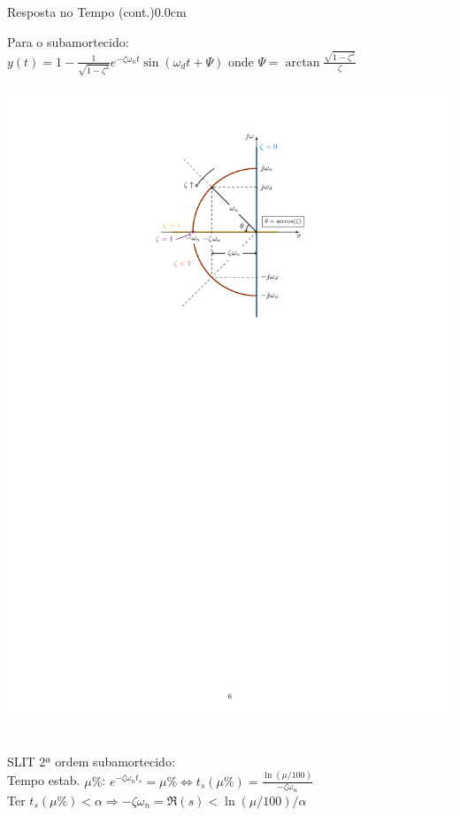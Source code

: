 \documentclass[portuguese,10pt,3col]{cheatsheet}
\begin{document}
\begin{multicols}{3}
\begin{cheatsheetbox}{Resposta no Tempo (cont.)}{0.0cm}
\begin{minipage}{.60\textwidth}
        Para o subamortecido: \\
        $y(t) = 1 - \frac{1}{\sqrt{1 - \zeta^2}}e^{-\zeta\omega_nt}\sin(\omega_d t + \Psi)$ onde $\Psi = \arctan\frac{\sqrt{1 - \zeta^2}}{\zeta}$
    \end{minipage}%
    \begin{minipage}{.4\textwidth}
	    \includegraphics[scale = 0.5, trim = 7cm 18.7cm 7cm 2cm, clip]{figs/fig1.pdf}
    \end{minipage} \\
    SLIT 2ª ordem subamortecido: \\
    Tempo estab. $\mu \%$: $e^{-\zeta \omega_n t_s } = \mu \% \Leftrightarrow t_s(\mu \%) = \frac{\ln(\mu / 100)}{-\zeta \omega_n}$ \\
    Ter $t_s(\mu\%) < \alpha \Rightarrow -\zeta \omega_n = \Re(s) < \ln(\mu/100)/\alpha$ \\

\end{cheatsheetbox}
\end{multicols}
\end{document}

